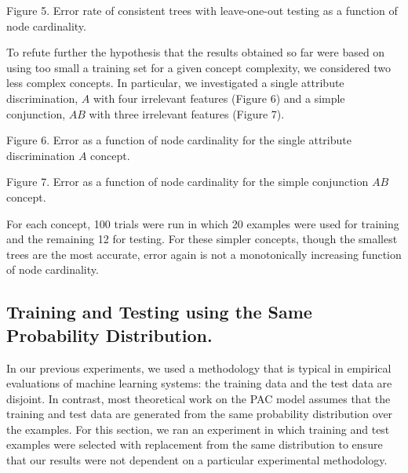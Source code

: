 \vspace*{0.3cm}
\hspace{0.6cm}
\centerline{}

\vspace{0.2cm}
\parindent 0.0cm
Figure 5. Error rate of consistent trees with leave-one-out testing
as a function of node cardinality.\\
\parindent 0.6cm
\parskip 0.0cm

To refute further the hypothesis that the results obtained so far were
based on using too small a training set for a given concept
complexity, we considered two less complex concepts. In particular, we
investigated a single attribute discrimination, $A$ with four irrelevant
features (Figure 6) and a simple conjunction, $AB$ with three
irrelevant features (Figure 7).  

\hspace{0.6cm}
\centerline{}

\vspace{0.2cm}
\parindent 0.0cm
Figure 6. Error as a function of node cardinality for the single
attribute discrimination $A$ concept.\\
\parindent 0.6cm

\hspace{0.6cm}
\centerline{}

\vspace*{0.2cm}
\parindent 0.0cm
Figure 7. Error as a function of node cardinality for the simple 
conjunction $AB$ concept.\\
\parindent 0.6cm
\parskip 0.0cm

For each concept, 100 trials were run
in which 20 examples were used for training and the remaining 12 for
testing.  For these simpler concepts, though the smallest trees are
the most accurate, error again is not a monotonically increasing
function of node cardinality.

\subsection{Training and Testing using the Same Probability Distribution.}

In our previous experiments, we used a methodology that is
typical in empirical evaluations of machine learning systems: the
training data and the test data are disjoint.  In contrast, most
theoretical work on the PAC model
\cite{valiant84} assumes that the training and test data are generated
from the same probability distribution over the examples. For this section, we
ran an experiment in which training and test examples were selected
with replacement from the same distribution to ensure that our results
were not dependent on a particular experimental methodology.  

